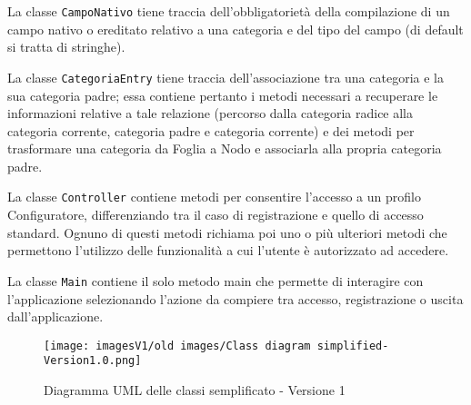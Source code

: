 La classe \texttt{CampoNativo} tiene traccia dell'obbligatorietà della compilazione di un campo nativo o ereditato relativo a una categoria e del tipo del campo (di default si tratta di stringhe). 

La classe \texttt{CategoriaEntry} tiene traccia dell'associazione tra una categoria e la sua categoria padre; essa contiene pertanto i metodi necessari a recuperare le informazioni relative a tale relazione (percorso dalla categoria radice alla categoria corrente, categoria padre e categoria corrente) e dei metodi per trasformare una categoria da Foglia a Nodo e associarla alla propria categoria padre.

La classe \texttt{Controller} contiene metodi per consentire l'accesso a un profilo Configuratore, differenziando tra il caso di registrazione e quello di accesso standard. Ognuno di questi metodi richiama poi uno o più ulteriori metodi che permettono l'utilizzo delle funzionalità a cui l'utente è autorizzato ad accedere.

La classe \texttt{Main} contiene il solo metodo main che permette di interagire con l'applicazione selezionando l'azione da compiere tra accesso, registrazione o uscita dall'applicazione.

\begin{figure}[!]
    \centering
    \texttt{[image: imagesV1/old images/Class diagram simplified-Version1.0.png]}
    \caption{\label{fig:Simplified Class Diagram - v1}Diagramma UML delle classi semplificato - Versione 1}
\end{figure}